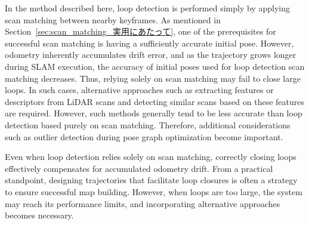 In the method described here, loop detection is performed simply by applying scan matching between nearby keyframes.
As mentioned in Section~\ref{sec:scan_matching_実用にあたって}, one of the prerequisites for successful scan matching is having a sufficiently accurate initial pose.
However, odometry inherently accumulates drift error, and as the trajectory grows longer during SLAM execution, the accuracy of initial poses used for loop detection scan matching decreases.
Thus, relying solely on scan matching may fail to close large loops.
In such cases, alternative approaches such as extracting features or descriptors from LiDAR scans and detecting similar scans based on these features are required.
However, such methods generally tend to be less accurate than loop detection based purely on scan matching.
Therefore, additional considerations such as outlier detection during pose graph optimization become important.

Even when loop detection relies solely on scan matching, correctly closing loops effectively compensates for accumulated odometry drift.
From a practical standpoint, designing trajectories that facilitate loop closures is often a strategy to ensure successful map building.
However, when loops are too large, the system may reach its performance limits, and incorporating alternative approaches becomes necessary.


